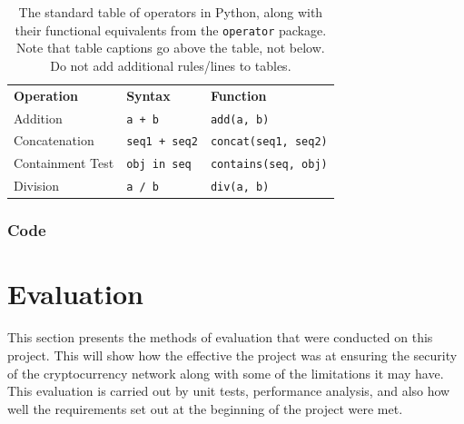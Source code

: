 \documentclass{l4proj}
\begin{document}
\begin{table}[]
    \caption{The standard table of operators in Python, along with their functional equivalents from the \texttt{operator} package. Note that table
    captions go above the table, not below. Do not add additional rules/lines to tables. }\label{tab:operators}
    \begin{tabular}{@{}lll@{}}
    \textbf{Operation}    & \textbf{Syntax}                & \textbf{Function}                            \\ %
    Addition              & \texttt{a + b}                          & \texttt{add(a, b)}                                    \\
    Concatenation         & \texttt{seq1 + seq2}                    & \texttt{concat(seq1, seq2)}                           \\
    Containment Test      & \texttt{obj in seq}                     & \texttt{contains(seq, obj)}                           \\
    Division              & \texttt{a / b}                          & \texttt{div(a, b) }  \\
    \end{tabular}
    \end{table}
\subsection{Code}

\chapter{Evaluation} 
This section presents the methods of evaluation that were conducted on this project. This will show how the effective the
project was at ensuring the security of the cryptocurrency network along with some of the limitations it may have. 
This evaluation is carried out by unit tests, performance analysis, and also how well the requirements set out at 
the beginning of the project were met.

\end{document}
